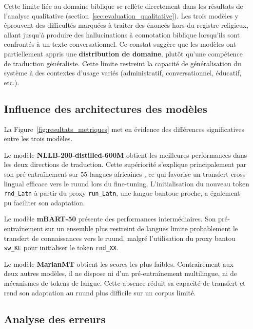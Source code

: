 Cette limite liée au domaine biblique se reflète directement dans les résultats de l'analyse qualitative (section~\ref{sec:evaluation_qualitative}). Les trois modèles y éprouvent des difficultés marquées à traiter des énoncés hors du registre religieux, allant jusqu'à produire des hallucinations à connotation biblique lorsqu'ils sont confrontés à un texte conversationnel. Ce constat suggère que les modèles ont partiellement appris une \textbf{distribution de domaine}, plutôt qu'une compétence de traduction généraliste. Cette limite restreint la capacité de généralisation du système à des contextes d'usage variés (administratif, conversationnel, éducatif, etc.).

\subsection{Influence des architectures des modèles}
\label{subsec:influence-architectures}

La Figure~\ref{fig:resultats_metriques} met en évidence des différences significatives entre les trois modèles.

Le modèle \textbf{\ac{NLLB}-200-distilled-600M} obtient les meilleures performances dans les deux directions de traduction. Cette supériorité s'explique principalement par son pré-entraînement sur 55 langues africaines \cite{nllbteam2022languageleftbehindscaling}, ce qui favorise un transfert cross-lingual efficace vers le ruund lors du fine-tuning. L'initialisation du nouveau token \texttt{rnd\_Latn} à partir du proxy \texttt{run\_Latn}, une langue bantoue proche, a également pu faciliter son adaptation.

Le modèle \textbf{\ac{mBART}-50} présente des performances intermédiaires. Son pré-entraînement sur un ensemble plus restreint de langues limite probablement le transfert de connaissances vers le ruund, malgré l'utilisation du proxy bantou \texttt{sw\_KE} pour initialiser le token \texttt{rnd\_XX}.

Le modèle \textbf{\ac{MarianMT}} obtient les scores les plus faibles. Contrairement aux deux autres modèles, il ne dispose ni d'un pré-entraînement multilingue, ni de mécanismes de tokens de langue. Cette absence réduit sa capacité de transfert et rend son adaptation au ruund plus difficile sur un corpus limité.
\subsection{Analyse des erreurs}
\label{subsec:analyse-erreurs}

